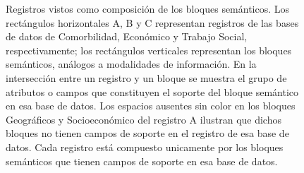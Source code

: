 \begin{figure}[H]
\endgroup
\caption[Los registros vistos como composición de bloques semánticos]{Registros vistos como composición de los bloques semánticos. Los rectángulos horizontales A, B y C representan registros de las bases de datos de Comorbilidad, Económico y Trabajo Social, respectivamente; los rectángulos verticales representan los bloques semánticos, análogos a modalidades de información. En la intersección entre un registro y un bloque se muestra el grupo de atributos o campos que constituyen el soporte del bloque semántico en esa base de datos. Los espacios ausentes sin color en los bloques Geográficos y Socioeconómico del registro A ilustran que dichos bloques no tienen campos de soporte en el registro de esa base de datos. Cada registro está compuesto unicamente por los bloques semánticos que tienen campos de soporte en esa base de datos.}
\label{fig:bloques_modalidades}
\end{figure}

